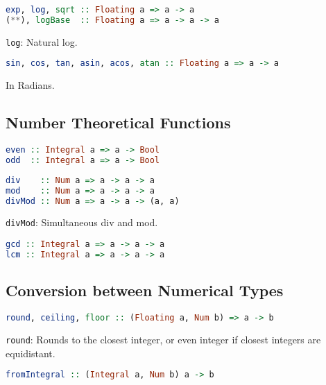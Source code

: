\documentclass[twocolumn,english]{article}
\begin{document}
\begin{lstlisting}[language=Haskell,frame=single]
exp, log, sqrt :: Floating a => a -> a
(**), logBase  :: Floating a => a -> a -> a
\end{lstlisting}


\texttt{log}: Natural log.

\begin{lstlisting}[language=Haskell,frame=single]
sin, cos, tan, asin, acos, atan :: Floating a => a -> a
\end{lstlisting}


In Radians.


\subsection{Number Theoretical Functions}

\begin{lstlisting}[language=Haskell,frame=single]
even :: Integral a => a -> Bool
odd  :: Integral a => a -> Bool
\end{lstlisting}


\begin{lstlisting}[language=Haskell,frame=single]
div    :: Num a => a -> a -> a
mod    :: Num a => a -> a -> a
divMod :: Num a => a -> a -> (a, a)
\end{lstlisting}


\texttt{divMod}: Simultaneous div and mod.
\begin{lstlisting}[language=Haskell,frame=single]
gcd :: Integral a => a -> a -> a
lcm :: Integral a => a -> a -> a
\end{lstlisting}



\subsection{Conversion between Numerical Types}

\begin{lstlisting}[language=Haskell,frame=single]
round, ceiling, floor :: (Floating a, Num b) => a -> b
\end{lstlisting}


\texttt{round}: Rounds to the closest integer, or even integer if
closest integers are equidistant.

\begin{lstlisting}[language=Haskell,frame=single]
fromIntegral :: (Integral a, Num b) a -> b
\end{lstlisting}
\end{document}
